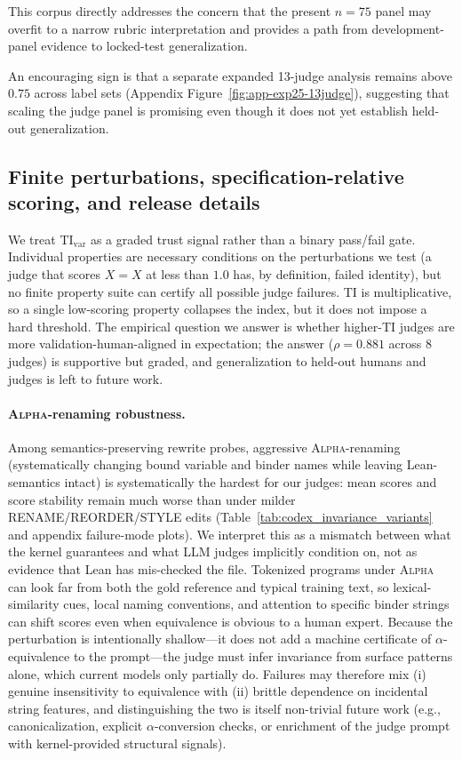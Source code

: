 \documentclass{article}
\begin{document}
This corpus directly addresses the concern that the present \(n=75\) panel may overfit to a narrow rubric interpretation and provides a path from development-panel evidence to locked-test generalization.

An encouraging sign is that a separate expanded 13-judge analysis remains above \(0.75\) across label sets (Appendix Figure~\ref{fig:app-exp25-13judge}), suggesting that scaling the judge panel is promising even though it does not yet establish held-out generalization.

\subsection{Finite perturbations, specification-relative scoring, and release details}\label{sec:limitations-finite}
We treat \(\mathrm{TI}_{\mathrm{var}}\) as a graded trust signal rather than a binary pass/fail gate.
Individual properties are necessary conditions on the perturbations we test (a judge that scores \(X=X\) at less than \(1.0\) has, by definition, failed identity), but no finite property suite can certify all possible judge failures.
TI is multiplicative, so a single low-scoring property collapses the index, but it does not impose a hard threshold.
The empirical question we answer is whether higher-TI judges are more validation-human-aligned in expectation; the answer (\(\rho=0.881\) across \(8\) judges) is supportive but graded, and generalization to held-out humans and judges is left to future work.

\paragraph{\textsc{Alpha}-renaming robustness.}
Among semantics-preserving rewrite probes, aggressive \textsc{Alpha}-renaming (systematically changing bound variable and binder names while leaving Lean-semantics intact) is systematically the hardest for our judges: mean scores and score stability remain much worse than under milder RENAME/REORDER/STYLE edits (Table~\ref{tab:codex_invariance_variants} and appendix failure-mode plots).
We interpret this as a mismatch between what the kernel guarantees and what LLM judges implicitly condition on, not as evidence that Lean has mis-checked the file.
Tokenized programs under \textsc{Alpha} can look far from both the gold reference and typical training text, so lexical-similarity cues, local naming conventions, and attention to specific binder strings can shift scores even when equivalence is obvious to a human expert.
Because the perturbation is intentionally shallow---it does not add a machine certificate of \(\alpha\)-equivalence to the prompt---the judge must infer invariance from surface patterns alone, which current models only partially do.
Failures may therefore mix (i) genuine insensitivity to equivalence with (ii) brittle dependence on incidental string features, and distinguishing the two is itself non-trivial future work (e.g., canonicalization, explicit $\alpha$-conversion checks, or enrichment of the judge prompt with kernel-provided structural signals).
\end{document}

